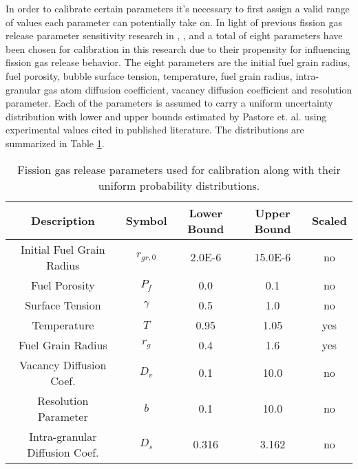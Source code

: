 In order to calibrate certain parameters it's necessary to first assign a valid range of values each parameter can potentially take on. In light of previous fission gas release parameter sensitivity research in \cite{Pastore2}, \cite{Swiler3}, and \cite{Johns} a total of eight parameters have been chosen for calibration in this research due to their propensity for influencing fission gas release behavior. The eight parameters are the initial fuel grain radius, fuel porosity, bubble surface tension, temperature, fuel grain radius, intra-granular gas atom diffusion coefficient, vacancy diffusion coefficient and resolution parameter. Each of the parameters is assumed to carry a uniform uncertainty distribution with lower and upper bounds estimated by Pastore et. al. \cite{Swiler3} \cite{Pastore2} using experimental values cited in published literature. The distributions are summarized in Table \ref{table:fgr_params}.
\begin{table} 
\caption{Fission gas release parameters used for calibration along with their uniform probability distributions.}
\label{table:fgr_params} 
\centering
\begin{tabular}{||c|c|c|c|c||} 
\hline \hline
\textbf{Description} & \textbf{Symbol} & \textbf{Lower Bound} & \textbf{Upper Bound} & \textbf{Scaled} \\ \hline
Initial Fuel Grain Radius & $r_{gr,0}$  & 2.0E-6 & 15.0E-6 & no \\ \hline
Fuel Porosity               & $P_f$      & 0.0      & 0.1      & no \\ \hline
Surface Tension           & $\gamma$  & 0.5     & 1.0      & no \\ \hline
Temperature               & $T$          & 0.95   & 1.05     & yes \\ \hline
Fuel Grain Radius         & $r_g$       & 0.4     & 1.6      & yes \\ \hline
Vacancy Diffusion Coef.  & $D_v$      & 0.1      & 10.0     & no \\ \hline
Resolution Parameter    & $b$         & 0.1      & 10.0     & no \\ \hline
Intra-granular Diffusion Coef. & $D_s$ & 0.316 & 3.162   & no \\ 
\hline \hline
\end{tabular}
\end{table}

